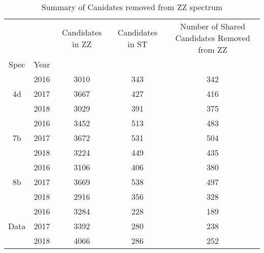 \begin{table}
\centering
\caption{Summary of Canidates removed from ZZ spectrum}
\label{tab:lap}
\begin{tabular}{ccccc}
\toprule
     &      &  Candidates in ZZ &  Candidates in ST &  Number of Shared Candidates Removed from ZZ \\
Spec & Year &                   &                   &                                              \\
\midrule
\multirow{3}{*}{4d} & 2016 &              3010 &               343 &                                          342 \\
     & 2017 &              3667 &               427 &                                          416 \\
     & 2018 &              3029 &               391 &                                          375 \\
\cline{1-5}
\multirow{3}{*}{7b} & 2016 &              3452 &               513 &                                          483 \\
     & 2017 &              3672 &               531 &                                          504 \\
     & 2018 &              3224 &               449 &                                          435 \\
\cline{1-5}
\multirow{3}{*}{8b} & 2016 &              3106 &               406 &                                          380 \\
     & 2017 &              3669 &               538 &                                          497 \\
     & 2018 &              2916 &               356 &                                          328 \\
\cline{1-5}
\multirow{3}{*}{Data} & 2016 &              3284 &               228 &                                          189 \\
     & 2017 &              3392 &               280 &                                          238 \\
     & 2018 &              4066 &               286 &                                          252 \\
\bottomrule
\end{tabular}
\end{table}
